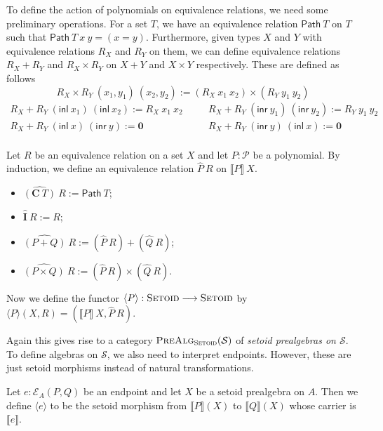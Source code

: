 \documentclass[9pt]{entcs}
\newcommand{\term}[1]{\mathsf{#1}}
\newcommand{\constructor}[1]{\mathbf{#1}}
\newcommand{\category}[1]{\textsc{#1}}
\newcommand{\function}[1]{\mathsf{#1}}
\newcommand{\0}{\textbf{0}} %
\newcommand{\1}{\textbf{1}} %
\newcommand{\inl}{\term{inl}} %
\newcommand{\inr}{\term{inr}} %
\newcommand{\Def}{:=} %
\newcommand{\setoids}{\category{Setoid}} %
\newcommand{\functor}[2]{#1 \longrightarrow #2} %
\newcommand{\poly}{\mathcal{P}} %
\newcommand{\C}{\constructor{C}} %
\newcommand{\I}{\constructor{I}} %
\newcommand{\sumP}[2]{#1 + #2} %
\newcommand{\prodP}[2]{#1 \times #2} %
\newcommand{\pathR}[1]{\function{Path} \> #1} %
\newcommand{\sumR}[2]{#1 + #2} %
\newcommand{\prodR}[2]{#1 \times #2} %
\newcommand{\polyR}[2]{\widehat{#1} \> #2} %
\newcommand{\ep}[3]{\mathcal{E}_{#1}(#2,#3)} %
\newcommand{\sig}{\mathcal{S}} %
\newcommand{\semP}[1]{\llbracket #1 \rrbracket} %
\newcommand{\semE}[1]{\llbracket #1 \rrbracket} %
\newcommand{\semPT}[1]{\langle #1 \rangle} %
\newcommand{\semET}[1]{\langle #1 \rangle} %
\newcommand{\prealgst}[1]{\category{PreAlg}_{\setoids}(#1)} %
\begin{document}
To define the action of polynomials on equivalence relations, we need some preliminary operations.
For a set $T$, we have an equivalence relation $\pathR{T}$ on $T$ such that $\pathR{T} \> x \> y = (x = y)$.
Furthermore, given types $X$ and $Y$ with equivalence relations $R_X$ and $R_Y$ on them, we can define equivalence relations $\sumR{R_X}{R_Y}$ and $\prodR{R_X}{R_Y}$ on $X + Y$ and $X \times Y$ respectively.
These are defined as follows
\[
\prodR{R_X}{R_Y} \> (x_1,y_1) \> (x_2,y_2) \Def (R_X \> x_1 \> x_2) \times (R_Y \> y_1 \> y_2)
\]
\[
\begin{array}{ccc}
\sumR{R_X}{R_Y} \> (\inl \> x_1) \> (\inl \> x_2) \Def R_X \> x_1 \> x_2 & \quad & \sumR{R_X}{R_Y} \> (\inr \> y_1) \> (\inr \> y_2) \Def R_Y \> y_1 \> y_2\\
\sumR{R_X}{R_Y} \> (\inl \> x) \> (\inr \> y) \Def \0 & \quad & \sumR{R_X}{R_Y} \> (\inr \> y) \> (\inl \> x) \Def \0\\ 
\end{array}
\]

\begin{definition}
Let $R$ be an equivalence relation on a set $X$ and let $P : \poly$ be a polynomial.
By induction, we define an equivalence relation $\polyR{P}{R}$ on $\semP{P} \> X$.
\begin{itemize}
	\item $\polyR{(\C \> T)}{R} \Def \pathR{T}$;
	\item $\polyR{\I}{R} \Def R$;
	\item $\polyR{(\sumP{P}{Q})}{R} \Def \sumR{(\polyR{P}{R})}{(\polyR{Q}{R})}$;
	\item $\polyR{(\prodP{P}{Q})}{R} \Def \prodR{(\polyR{P}{R})}{(\polyR{Q}{R})}$.
\end{itemize}
Now we define the functor $\semPT{P} : \functor{\setoids}{\setoids}$ by $\semPT{P}(X,R) = (\semP{P} \> X, \polyR{P}{R})$.
\end{definition}

Again this gives rise to a category $\prealgst{\sig}$ of \emph{setoid prealgebras on $\sig$}.
To define algebras on $\sig$, we also need to interpret endpoints.
However, these are just setoid morphisms instead of natural transformations.

\begin{definition}
Let $e : \ep{A}{P}{Q}$ be an endpoint and let $X$ be a setoid prealgebra on $A$.
Then we define $\semET{e}$ to be the setoid morphism from $\semE{P}(X)$ to $\semE{Q}(X)$ whose carrier is $\semP{e}$.
\end{definition}
\end{document}
